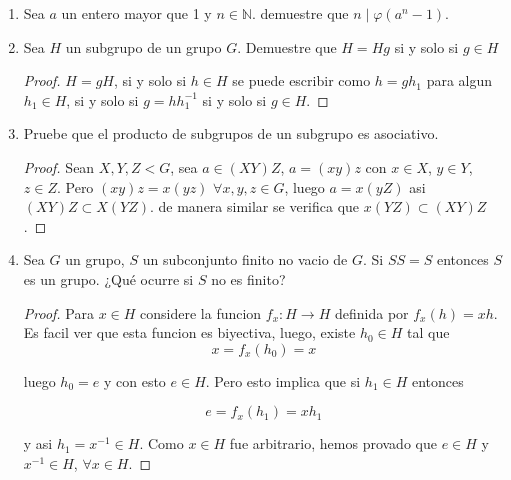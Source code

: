 \documentclass{article}
\theoremstyle{break}
\begin{document}
\begin{enumerate}
		\begin{proof}
			Sabemos que si $HK$ es un grupo, entonces 
			
			$|HK|=\frac{|H||K|}{|H\cap K|}\in \mathbb{Z}$, 
			
			luego $|H\cap K|\mid |K|$, entonces 
			
			$\frac{|K|}{|H\cap K|}=p^{d-a}$ con $p^a=|H\cap K|\not=|H|$,
			
			asi $|HK|=p^k p^{d-a}$ entonces, como $|HK|\mid |G|$, $p^k p^{d-a}\mid p^k m$, luego $p^{d-a}\mid m$ lo cual es una contradiccion.
		\end{proof}
		
		\item Sea $a$ un entero mayor que 1 y $n\in\mathbb{N}$. demuestre que $n\mid\varphi(a^n-1)$.
		
		\item Sea $H$ un subgrupo de un grupo $G$. Demuestre que $H=Hg$ si y solo si $g\in H$
		
		\begin{proof}
			$H=gH$, si y solo si $h\in H$ se puede escribir como $h=gh_1$ para algun $h_1\in H$, si y solo si $g=hh_1^{-1}$ si y solo si $g\in H$. 
		\end{proof}
		
		\item Pruebe que el producto de subgrupos de un subgrupo es asociativo.
		
		\begin{proof}
			Sean $X,Y,Z <G$, sea $a\in (XY)Z$, $a=(xy)z$ con $x\in X$, $y\in Y$, $z\in Z$. Pero $(xy)z=x(yz)$ $\forall x,y,z\in G$, luego $a=x(yZ)$ asi $(XY)Z\subset X(YZ)$. de manera similar se verifica que $x(YZ)\subset (XY)Z$. 
		\end{proof}
		
		\item Sea $G$ un grupo, $S$ un subconjunto finito no vacio de $G$. Si $SS=S$ entonces $S$ es un grupo. ¿Qu\'e ocurre si $S$ no es finito?
		
		\begin{proof}
			Para $x\in H$ considere la funcion $f_x:H\rightarrow H$ definida por $f_x(h)=xh$. Es facil ver que esta funcion es biyectiva, luego, existe $h_0\in H$ tal que 
			$$
			x=f_x(h_0)=x
			$$
			
			luego $h_0=e$ y con esto $e\in H$. Pero esto implica que  si $h_1\in H$ entonces 
			
			$$
			e=f_x(h_1)=xh_1
			$$
			
			y asi $h_1=x^{-1}\in H$. Como $x\in H$ fue arbitrario, hemos provado que $e\in H$ y $x^{-1}\in H$, $\forall x\in H$.
			
		\end{proof}
	\end{enumerate}
\end{document}
